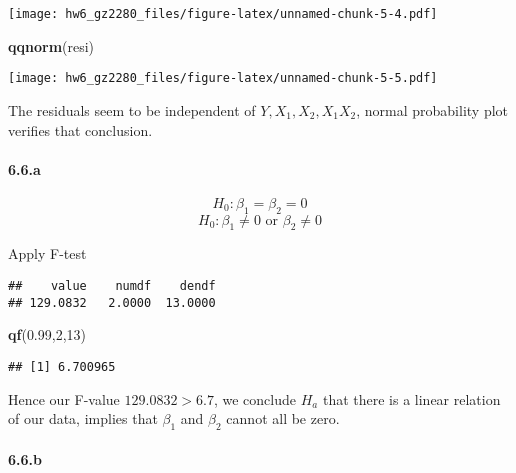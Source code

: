 \documentclass[]{article}
\newenvironment{Shaded}{\begin{snugshade}}{\end{snugshade}}
\newcommand{\DecValTok}[1]{\textcolor[rgb]{0.00,0.00,0.81}{#1}}
\newcommand{\FloatTok}[1]{\textcolor[rgb]{0.00,0.00,0.81}{#1}}
\newcommand{\KeywordTok}[1]{\textcolor[rgb]{0.13,0.29,0.53}{\textbf{#1}}}
\newcommand{\NormalTok}[1]{#1}
\newcommand{\OperatorTok}[1]{\textcolor[rgb]{0.81,0.36,0.00}{\textbf{#1}}}
\let\oldparagraph\paragraph
\renewcommand{\paragraph}[1]{\oldparagraph{#1}\mbox{}}
\begin{document}
\texttt{[image: hw6\_gz2280\_files/figure-latex/unnamed-chunk-5-4.pdf]}

\begin{Shaded}
\begin{Highlighting}[]
\KeywordTok{qqnorm}\NormalTok{(resi)}
\end{Highlighting}
\end{Shaded}

\texttt{[image: hw6\_gz2280\_files/figure-latex/unnamed-chunk-5-5.pdf]}

The residuals seem to be independent of \(Y,X_1,X_2,X_1X_2\), normal
probability plot verifies that conclusion.

\hypertarget{a-1}{%
\paragraph{6.6.a}\label{a-1}}

\[H_0: \beta_1=\beta_2=0\] \[H_0: \beta_1\ne 0 \text{ or } \beta_2\ne0\]

Apply F-test

\begin{Shaded}
\end{Shaded}

\begin{verbatim}
##    value    numdf    dendf 
## 129.0832   2.0000  13.0000
\end{verbatim}

\begin{Shaded}
\begin{Highlighting}[]
\KeywordTok{qf}\NormalTok{(}\FloatTok{0.99}\NormalTok{,}\DecValTok{2}\NormalTok{,}\DecValTok{13}\NormalTok{)}
\end{Highlighting}
\end{Shaded}

\begin{verbatim}
## [1] 6.700965
\end{verbatim}

Hence our F-value \(129.0832 > 6.7\), we conclude \(H_a\) that there is
a linear relation of our data, implies that \(\beta_1\) and \(\beta_2\)
cannot all be zero.

\hypertarget{b-1}{%
\paragraph{6.6.b}\label{b-1}}
\end{document}
